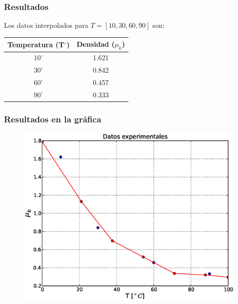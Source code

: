 \begin{frame}
\frametitle{Resultados}
Los datos interpolados para $T = [10, 30, 60, 90]$ son:
\begin{center}
	 \begin{tabular}{c | c}
			Temperatura (T$^{\circ}$) & Densidad ($\mu_{k}$) \\ \hline
			$10^{\circ}$ & 1.621 \\ \hline
			$30^{\circ}$ & 0.842 \\ \hline
			$60^{\circ}$ & 0.457 \\ \hline
			$90^{\circ}$ & 0.333 	 
	 \end{tabular}
\end{center}
\end{frame}
\begin{frame}
\frametitle{Resultados en la gr\'{a}fica}
\begin{figure}
	\centering
	\includegraphics[scale=0.45]{Imagenes/Tarea_Raices_Problema_4_02.eps}
\end{figure}
\end{frame}
